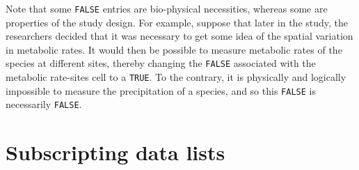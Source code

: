 \documentclass{article}
\newcommand{\code}[1]{\texttt{#1}}
\numberwithin{exercise}{section}
\begin{document}
Note that some \code{FALSE} entries are bio-physical necessities, whereas some are properties of the study design.  For example, suppose that later in the study, the researchers decided that it was necessary to get some idea of the spatial variation in metabolic rates.  It would then be possible to measure metabolic rates of the species at different sites, thereby changing the \code{FALSE} associated with the metabolic rate-sites cell to a \code{TRUE}.  To the contrary, it is physically and logically impossible to measure the precipitation of a species, and so this \code{FALSE} is necessarily \code{FALSE}.

\section{Subscripting data lists}
\end{document}
